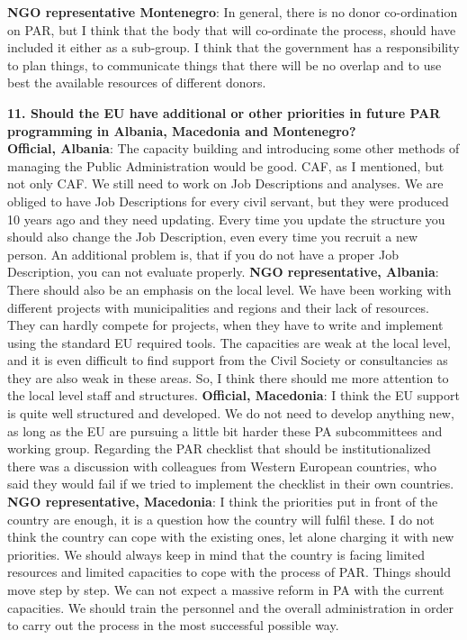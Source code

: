 \textbf{NGO representative Montenegro}: In general, there is no donor co-ordination on PAR, but I think that the body that will co-ordinate the process, should have included it either as a sub-group. I think that the government has a responsibility to plan things, to communicate things that there will be no overlap and to use best the available resources of different donors. \newpage
\textbf{11. Should the EU have additional or other priorities in future PAR programming in Albania, Macedonia and Montenegro?}\\
\textbf{Official, Albania}: The capacity building and introducing some other methods of managing the Public Administration would be good. CAF, as I mentioned, but not only CAF. We still need to work on Job Descriptions and analyses. We are obliged to have Job Descriptions for every civil servant, but they were produced 10 years ago and they need updating. Every time you update the structure you should also change the Job Description, even every time you recruit a new person. An additional problem is, that if you do not have a proper Job Description, you can not evaluate properly.
\textbf{NGO representative, Albania}: There should also be an emphasis on the local level. We have been working with different projects with municipalities and regions and their lack of resources. They can hardly compete for projects, when they have to write and implement using the standard EU required tools. The capacities are weak at the local level, and it is even difficult to find support from the Civil Society or consultancies as they are also weak in these areas. So, I think there should me more attention to the local level staff and structures.
\textbf{Official, Macedonia}: I think the EU support is quite well structured and developed. We do not need to develop anything new, as long as the EU are pursuing a little bit harder these PA subcommittees and working group. Regarding the PAR checklist that should be institutionalized there was a discussion with colleagues from Western European countries, who said they would fail if we tried to implement the checklist in their own countries.
\textbf{NGO representative, Macedonia}: I think the priorities put in front of the country are enough, it is a question how the country will fulfil these. I do not think the country can cope with the existing ones, let alone charging it with new priorities. We should always keep in mind that the country is facing limited resources and limited capacities to cope with the process of PAR. Things should move step by step. We can not expect a massive reform in PA with the current capacities. We should train the personnel and the overall administration in order to carry out the process in the most successful possible way.
